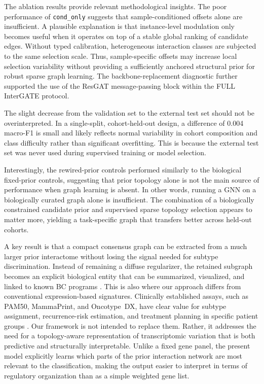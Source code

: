 \documentclass[unnumsec,webpdf,modern,large]{oup-authoring-template}
\newcounter{panel}
\begin{document}
The ablation results provide relevant methodological insights. The poor performance of \texttt{cond\_only} suggests that sample-conditioned offsets alone are insufficient. A plausible explanation is that instance-level modulation only becomes useful when it operates on top of a stable global ranking of candidate edges. Without typed calibration, heterogeneous interaction classes are subjected to the same selection scale. Thus, sample-specific offsets may increase local selection variability without providing a sufficiently anchored structural prior for robust sparse graph learning. The backbone-replacement diagnostic further supported the use of the ResGAT message-passing block within the FULL InterGATE protocol.


The slight decrease from the validation set to the external test set should not be overinterpreted. In a single-split, cohort-held-out design, a difference of 0.004 macro-F1 is small and likely reflects normal variability in cohort composition and class difficulty rather than significant overfitting. This is because the external test set was never used during supervised training or model selection.

Interestingly, the rewired-prior controls performed similarly to the biological fixed-prior controls, suggesting that prior topology alone is not the main source of performance when graph learning is absent. In other words, running a GNN on a biologically curated graph alone is insufficient. The combination of a biologically constrained candidate prior and supervised sparse topology selection appears to matter more, yielding a task-specific graph that transfers better across held-out cohorts.

A key result is that a compact consensus graph can be extracted from a much larger prior interactome without losing the signal needed for subtype discrimination. Instead of remaining a diffuse regularizer, the retained subgraph becomes an explicit biological entity that can be summarized, visualized, and linked to known BC programs \citep{Barabasi2011NetworkMedicine,Hofree2013NBS,Gogoshin2023GNNCancer}. This is also where our approach differs from conventional expression-based signatures. Clinically established assays, such as PAM50, MammaPrint, and Oncotype~DX, have clear value for subtype assignment, recurrence-risk estimation, and treatment planning in specific patient groups \citep{Parker2009PAM50,VanTVeer2002Signature,Paik2004OncotypeDX}. Our framework is not intended to replace them. Rather, it addresses the need for a topology-aware representation of transcriptomic variation that is both predictive and structurally interpretable. Unlike a fixed gene panel, the present model explicitly learns which parts of the prior interaction network are most relevant to the classification, making the output easier to interpret in terms of regulatory organization than as a simple weighted gene list.
\end{document}
